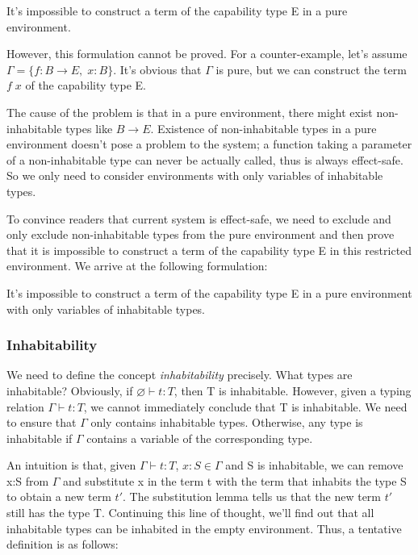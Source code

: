\begin{definition}
  It's impossible to construct a term of the capability type E in a
  pure environment.
\end{definition}

However, this formulation cannot be proved.  For a counter-example,
let's assume $\Gamma = \{f: B \to E, \; x: B\}$. It's obvious that
$\Gamma$ is pure, but we can construct the term $f \; x$ of the
capability type E.

The cause of the problem is that in a pure environment, there might
exist non-inhabitable types like $B \to E$.  Existence of
non-inhabitable types in a pure environment doesn't pose a problem to
the system; a function taking a parameter of a non-inhabitable type
can never be actually called, thus is always effect-safe. So we only
need to consider environments with only variables of inhabitable
types.

To convince readers that current system is effect-safe, we need to
exclude and only exclude non-inhabitable types from the pure
environment and then prove that it is impossible to construct a term
of the capability type E in this restricted environment. We arrive at
the following formulation:

\begin{definition}
  It's impossible to construct a term of the capability type E in a
  pure environment with only variables of inhabitable types.
\end{definition}

\subsubsection{Inhabitability}

We need to define the concept \emph{inhabitability} precisely. What
types are inhabitable? Obviously, if $\varnothing \vdash t: T$, then T
is inhabitable.  However, given a typing relation
$\Gamma \vdash t: T$, we cannot immediately conclude that T is
inhabitable. We need to ensure that $\Gamma$ only contains inhabitable
types. Otherwise, any type is inhabitable if $\Gamma$ contains a
variable of the corresponding type.

An intuition is that, given $\Gamma \vdash t: T$, $x:S \in \Gamma$ and
S is inhabitable, we can remove x:S from $\Gamma$ and substitute x in
the term t with the term that inhabits the type S to obtain a new term
$t'$. The substitution lemma tells us that the new term $t'$ still has
the type T. Continuing this line of thought, we'll find out that all
inhabitable types can be inhabited in the empty environment. Thus, a
tentative definition is as follows:

